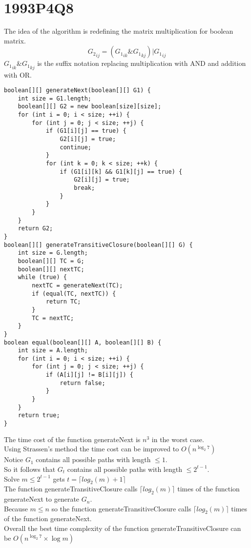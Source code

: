 \documentclass[10pt,twoside,a4paper]{article}
\begin{document}
\section{1993P4Q8}
The idea of the algorithm is redefining the matrix multiplication for boolean matrix.
$${G_{2}}_{ij}=({G_{1}}_{ik} \& {G_{1}}_{kj})|{G_{1}}_{ij}$$
${G_{1}}_{ik} \& {G_{1}}_{kj}$ is the suffix notation replacing multiplication with AND and addition with OR.
\begin{lstlisting}
boolean[][] generateNext(boolean[][] G1) {
	int size = G1.length;
	boolean[][] G2 = new boolean[size][size];
	for (int i = 0; i < size; ++i) {
		for (int j = 0; j < size; ++j) {
			if (G1[i][j] == true) {
				G2[i][j] = true;
				continue;
			}
			for (int k = 0; k < size; ++k) {
				if (G1[i][k] && G1[k][j] == true) {
					G2[i][j] = true;
					break;
				}
			}
		}
	}
	return G2;
}
boolean[][] generateTransitiveClosure(boolean[][] G) {
	int size = G.length;
	boolean[][] TC = G;
	boolean[][] nextTC;
	while (true) {
		nextTC = generateNext(TC);
		if (equal(TC, nextTC)) {
			return TC;
		}
		TC = nextTC;
	}
}
boolean equal(boolean[][] A, boolean[][] B) {
	int size = A.length;
	for (int i = 0; i < size; ++i) {
		for (int j = 0; j < size; ++j) {
			if (A[i][j] != B[i][j]) {
				return false;
			}
		}
	}
	return true;
}
\end{lstlisting}
The time cost of the function generateNext is $n^3$ in the worst case.
\\Using Strassen's method the time cost can be improved to $O(n^{\log_2 7})$
\\Notice $G_1$ contains all possible paths with length $\leq 1$.
\\So it follows that $G_t$ contains all possible paths with length $\leq 2^{t-1}$.
\\Solve $m\leq 2^{t-1}$ gets $t=\lceil log_2(m) +1 \rceil$
\\The function generateTransitiveClosure calls $\lceil log_2(m)\rceil$ times of the function generateNext to generate $G_n$.
\\Because $m\leq n$ so the function generateTransitiveClosure calls $\lceil log_2(m)\rceil$ times of the function generateNext.
\\Overall the best time complexity of the function generateTransitiveClosure can be $O(n^{\log_2 7}\times \log m)$
\end{document}
